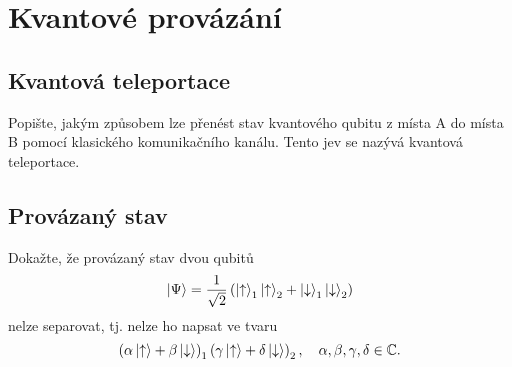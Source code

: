 \section{Kvantové provázání}
    \subsection{Kvantová teleportace}
        Popište, jakým způsobem lze přenést stav kvantového qubitu z místa A do místa B pomocí klasického komunikačního kanálu. Tento jev se nazývá kvantová teleportace.

    \subsection{Provázaný stav}
        Dokažte, že provázaný stav dvou qubitů 
        \begin{equation}
            \left|{\Psi}\right\rangle=\frac{1}{\sqrt{2}}\left(\left|{\uparrow}\right\rangle_{1}\left|{\uparrow}\right\rangle_{2}+\left|{\downarrow}\right\rangle_{1}\left|{\downarrow}\right\rangle_{2}\right)
        \end{equation}
        nelze separovat, tj. nelze ho napsat ve tvaru
        \begin{equation}
            \left(\alpha\left|{\uparrow}\right\rangle+\beta\left|{\downarrow}\right\rangle\right)_{1}\left(\gamma\left|{\uparrow}\right\rangle+\delta\left|{\downarrow}\right\rangle\right)_{2},\quad\alpha,\beta,\gamma,\delta\in\mathbb{C}.
        \end{equation}
